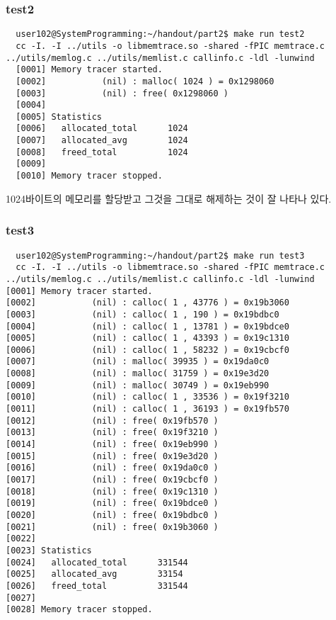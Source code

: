 \documentclass{report}
\begin{document}
\subsubsection{test2}
\begin{verbatim}
  user102@SystemProgramming:~/handout/part2$ make run test2
  cc -I. -I ../utils -o libmemtrace.so -shared -fPIC memtrace.c ../utils/memlog.c ../utils/memlist.c callinfo.c -ldl -lunwind
  [0001] Memory tracer started.
  [0002]           (nil) : malloc( 1024 ) = 0x1298060
  [0003]           (nil) : free( 0x1298060 )
  [0004]
  [0005] Statistics
  [0006]   allocated_total      1024
  [0007]   allocated_avg        1024
  [0008]   freed_total          1024
  [0009]
  [0010] Memory tracer stopped.
\end{verbatim}
1024바이트의 메모리를 할당받고 그것을 그대로 해제하는 것이 잘 나타나 있다.

\subsubsection{test3}
\begin{verbatim}
  user102@SystemProgramming:~/handout/part2$ make run test3
  cc -I. -I ../utils -o libmemtrace.so -shared -fPIC memtrace.c ../utils/memlog.c ../utils/memlist.c callinfo.c -ldl -lunwind
[0001] Memory tracer started.
[0002]           (nil) : calloc( 1 , 43776 ) = 0x19b3060
[0003]           (nil) : calloc( 1 , 190 ) = 0x19bdbc0
[0004]           (nil) : calloc( 1 , 13781 ) = 0x19bdce0
[0005]           (nil) : calloc( 1 , 43393 ) = 0x19c1310
[0006]           (nil) : calloc( 1 , 58232 ) = 0x19cbcf0
[0007]           (nil) : malloc( 39935 ) = 0x19da0c0
[0008]           (nil) : malloc( 31759 ) = 0x19e3d20
[0009]           (nil) : malloc( 30749 ) = 0x19eb990
[0010]           (nil) : calloc( 1 , 33536 ) = 0x19f3210
[0011]           (nil) : calloc( 1 , 36193 ) = 0x19fb570
[0012]           (nil) : free( 0x19fb570 )
[0013]           (nil) : free( 0x19f3210 )
[0014]           (nil) : free( 0x19eb990 )
[0015]           (nil) : free( 0x19e3d20 )
[0016]           (nil) : free( 0x19da0c0 )
[0017]           (nil) : free( 0x19cbcf0 )
[0018]           (nil) : free( 0x19c1310 )
[0019]           (nil) : free( 0x19bdce0 )
[0020]           (nil) : free( 0x19bdbc0 )
[0021]           (nil) : free( 0x19b3060 )
[0022]
[0023] Statistics
[0024]   allocated_total      331544
[0025]   allocated_avg        33154
[0026]   freed_total          331544
[0027]
[0028] Memory tracer stopped.
\end{verbatim}
\end{document}
